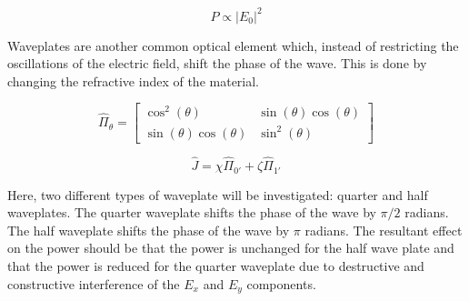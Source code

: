 \documentclass[aip, cp, amsmath, amssymb, reprint]{revtex4-2}
\begin{document}
        \begin{equation} \label{eqn:power}
            P \propto |E_0|^2
        \end{equation}

        Waveplates are another common optical element which, instead of restricting the oscillations of the electric field, shift the phase of the wave. This is done by changing the refractive index of the material.
        
        \begin{equation} \label{eqn:generalized-polarizer}
            \hat{\Pi}_{\theta} = \begin{bmatrix} \cos^2(\theta) & \sin(\theta)\cos(\theta) \\ \sin(\theta)\cos(\theta) & \sin^2(\theta)\end{bmatrix}
        \end{equation}

        \begin{equation} \label{eqn:jones-mat}
            \hat{J} = \chi\hat{\Pi}_{0'} + \zeta\hat{\Pi}_{1'}
        \end{equation}

        Here, two different types of waveplate will be investigated: quarter and half waveplates. The quarter waveplate shifts the phase of the wave by $\pi/2$ radians. The half waveplate shifts the phase of the wave by $\pi$ radians. The resultant effect on the power should be that the power is unchanged for the half wave plate and that the power is reduced for the quarter waveplate due to destructive and constructive interference of the $E_x$ and $E_y$ components.
\end{document}
